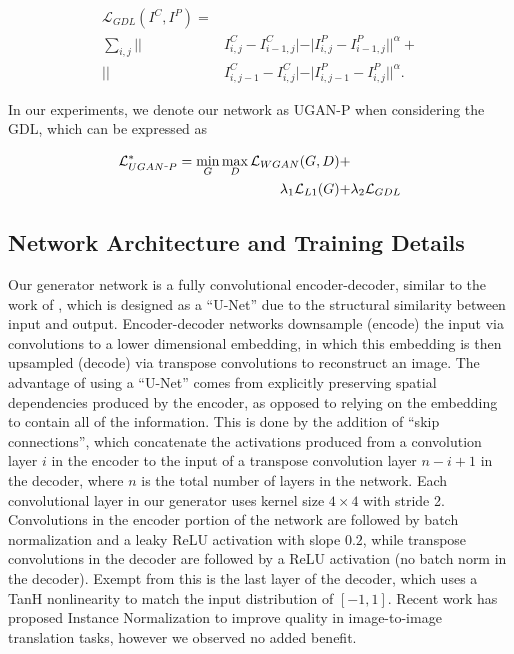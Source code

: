 \begin{equation}
   \begin{aligned}
      \mathcal{L}_{GDL}(I^C, I^P) = \\ \sum\limits_{i,j} || & I^C_{i,j} - I^C_{i-1,j}| - | I^P_{i,j} - I^P_{i-1,j}||^{\alpha} + \\
      || & I^C_{i,j-1} - I^C_{i,j}| - | I^P_{i,j-1} - I^P_{i,j}||^{\alpha}.
   \end{aligned}
   \label{gdl_eq}
\end{equation}

\noindent In our experiments, we denote our network as UGAN-P when considering the GDL, which can be expressed as

\begin{equation}
   \begin{aligned}
      \mathcal{L}_{UGAN\scalebox{0.4}[1.0]{\( - \)}P}^* = \min\limits_{G}\max\limits_{D} \mathcal{L}_{WGAN}(G,D) + & \\
      \lambda_{1} \mathcal{L}_{L1}(G) + & \lambda_{2} \mathcal{L}_{GDL}
   \end{aligned}
\end{equation}


\subsection{Network Architecture and Training Details}
Our generator network is a fully convolutional encoder-decoder, similar to the work of \cite{isola2016image}, which is
designed as a ``U-Net'' \cite{ronneberger2015u} due to the structural similarity between input and output.
Encoder-decoder networks downsample (encode) the input via convolutions to a lower dimensional embedding, in which
this embedding is then upsampled (decode) via transpose convolutions to reconstruct an image. The advantage of using
a ``U-Net'' comes from explicitly preserving spatial dependencies produced by the encoder, as opposed to relying on the
embedding to contain all of the information. This is done by the addition of ``skip connections'', which concatenate
the activations produced from a convolution layer $i$ in the encoder to the input of a transpose convolution layer
$n-i+1$ in the decoder, where $n$ is the total number of layers in the network. Each convolutional layer in our
generator uses kernel size $4 \times 4$ with stride 2. Convolutions in the encoder portion of the network are followed
by batch normalization \cite{pmlr-v37-ioffe15} and a leaky ReLU activation with slope $0.2$, while transpose
convolutions in the decoder are followed by a ReLU activation \cite{nair2010rectified} (no batch norm in the decoder).
Exempt from this is the last layer of the decoder, which uses a TanH nonlinearity to match the input distribution of
$[-1, 1]$. Recent work has proposed Instance Normalization \cite{ulyanov2016instance} to improve quality
in image-to-image translation tasks, however we observed no added benefit.

